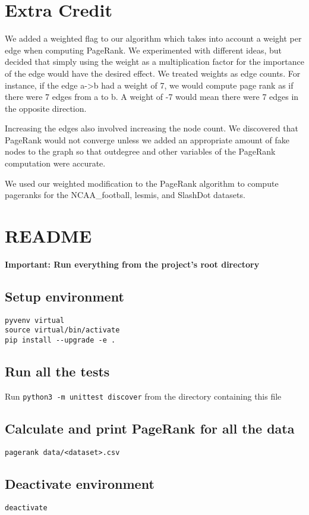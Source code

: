 \documentclass{report}
\begin{document}
\section{Extra Credit}
We added a weighted flag to our algorithm which takes into account a weight per
edge when computing PageRank. We experimented with different ideas, but decided
that simply using the weight as a multiplication factor for the importance of
the edge would have the desired effect. We treated weights as edge counts.  For
instance, if the edge a->b had a weight of 7, we would compute page rank as if
there were 7 edges from a to b. A weight of -7 would mean there were 7 edges in
the opposite direction.

Increasing the edges also involved increasing the node count. We discovered that
PageRank would not converge unless we added an appropriate amount of fake nodes
to the graph so that outdegree and other variables of the PageRank computation
were accurate.

We used our weighted modification to the PageRank algorithm to compute pageranks
for the NCAA\_football, lesmis, and SlashDot datasets.


\appendix

\section{README}
\lstset{lang=bash}
\textbf{Important: Run everything from the project's root directory}

\subsection{Setup environment}
\begin{lstlisting}
pyvenv virtual
source virtual/bin/activate
pip install --upgrade -e .
\end{lstlisting}

\subsection{Run all the tests}
Run \verb+python3 -m unittest discover+ from the directory containing
this file

\subsection{Calculate and print PageRank for all the data}
\begin{lstlisting}
pagerank data/<dataset>.csv
\end{lstlisting}

\subsection{Deactivate environment}
\begin{lstlisting}
deactivate
\end{lstlisting}
\end{document}
